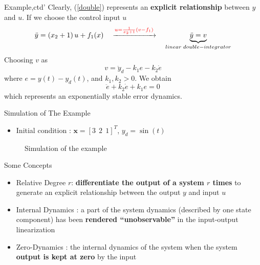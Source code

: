 \documentclass{beamer}
\renewcommand{\vec}[1]{\ensuremath{\boldsymbol{#1}}} %
\begin{document}
\begin{frame}{Example,ctd'}
    Clearly, (\ref{double}) represents an \textbf{explicit relationship} between {\color{red}$y$} and {\color{red}$u$}.  If we choose the control input {\color{red}$u$}
    $$
         \ddot{y}=\left(x_{2}+1\right) u+f_{1}(x) \quad \xrightarrow{ {\color{red}u=\frac{1}{x_{2}+1}\left(v-f_{1}\right)}} \quad \underbrace{\ddot{y} = v}_{\tiny linear~double-integrator}
    $$
    Choosing $v$ as
    \begin{equation}\label{choose-v}
        v = \ddot{y}_{d}-k_{1}e-k_{2}\dot{e}
    \end{equation}
    where $e=y(t)-y_{d}(t)$, and $k_{1}, k_{2} > 0$. We obtain
    $$\ddot{e}+k_{2} \dot{e}+k_{1} e = 0$$
which represents an {\color{red}exponentially stable} error dynamics.
\end{frame}


\begin{frame}{Simulation of The Example}
    \begin{itemize}
      \item Initial condition : $\vec{x}=\left[ 3~~2~~1\right]^{T}$, $y_{d} = \sin(t)$ 
    \end{itemize}
    
    \begin{figure}[htbp]
     \centering
     \caption{Simulation of the example}
     \label{fig:subfig}
     \end{figure}
\end{frame}


\begin{frame}{Some Concepts}
    \begin{itemize}
        \item {\color{red}Relative Degree $r$}: \textbf{differentiate the output of a system $r$ times} to generate an explicit relationship between the output $y$ and input $u$
        \item {\color{red}Internal Dynamics} : a part of the system dynamics (described by one state component) has been \textbf{rendered             ``unobservable''} in the input-output linearization
        \item {\color{red}Zero-Dynamics} : the internal dynamics of the system when the system \textbf{output is kept at zero} by the input
    \end{itemize}
\end{frame}
\end{document}
